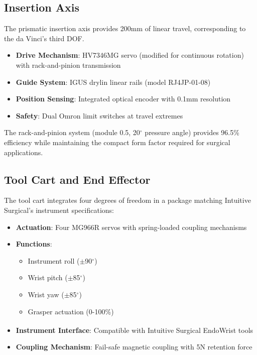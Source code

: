 \subsection{Insertion Axis}
The prismatic insertion axis provides 200mm of linear travel, corresponding to the da Vinci's third DOF.

\begin{itemize}
    \item \textbf{Drive Mechanism}: HV7346MG servo (modified for continuous rotation) with rack-and-pinion transmission
    \item \textbf{Guide System}: IGUS drylin linear rails (model RJ4JP-01-08)
    \item \textbf{Position Sensing}: Integrated optical encoder with 0.1mm resolution
    \item \textbf{Safety}: Dual Omron limit switches at travel extremes
\end{itemize}

The rack-and-pinion system (module 0.5, 20$^\circ$ pressure angle) provides 96.5\% efficiency while maintaining the compact form factor required for surgical applications.

\subsection{Tool Cart and End Effector}
The tool cart integrates four degrees of freedom in a package matching Intuitive Surgical's instrument specifications:

\begin{itemize}
    \item \textbf{Actuation}: Four MG966R servos with spring-loaded coupling mechanisms
    \item \textbf{Functions}:
        \begin{itemize}
            \item Instrument roll ($\pm$90$^\circ$)
            \item Wrist pitch ($\pm$85$^\circ$)
            \item Wrist yaw ($\pm$85$^\circ$)
            \item Grasper actuation (0-100\%)
        \end{itemize}
    \item \textbf{Instrument Interface}: Compatible with Intuitive Surgical EndoWrist\textsuperscript{\textregistered} tools
    \item \textbf{Coupling Mechanism}: Fail-safe magnetic coupling with 5N retention force
\end{itemize}

